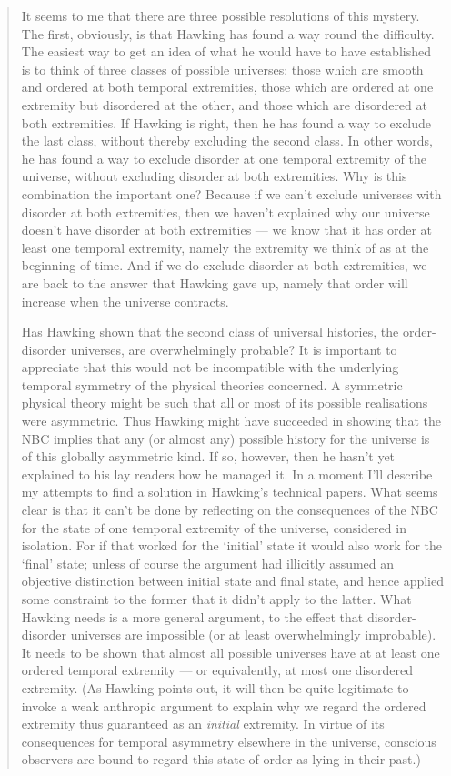 \documentclass{article}
\begin{document}
\begin{quote}
It seems to me that there are three possible resolutions of this
mystery. The first, obviously, is that Hawking has found a way round the
difficulty. The easiest way to get an idea of what he would have to have
established is to think of three classes of possible universes: those
which are smooth and ordered at both temporal extremities, those which
are ordered at one extremity but disordered at the other, and those
which are disordered at both extremities. If Hawking is right, then he
has found a way to exclude the last class, without thereby excluding the
second class. In other words, he has found a way to exclude disorder at
one temporal extremity of the universe, without excluding disorder at
both extremities. Why is this combination the important one? Because if
we can't exclude universes with disorder at both extremities, then we
haven't explained why our universe doesn't have disorder at both
extremities --- we know that it has order at least one temporal
extremity, namely the extremity we think of as at the beginning of time.
And if we do exclude disorder at both extremities, we are back to the
answer that Hawking gave up, namely that order will increase when the
universe contracts.

Has Hawking shown that the second class of universal histories, the
order-disorder universes, are overwhelmingly probable? It is important
to appreciate that this would not be incompatible with the underlying
temporal symmetry of the physical theories concerned. A symmetric
physical theory might be such that all or most of its possible
realisations were asymmetric. Thus Hawking might have succeeded in
showing that the NBC implies that any (or almost any) possible history
for the universe is of this globally asymmetric kind. If so, however,
then he hasn't yet explained to his lay readers how he managed it. In a
moment I'll describe my attempts to find a solution in Hawking's
technical papers. What seems clear is that it can't be done by
reflecting on the consequences of the NBC for the state of one temporal
extremity of the universe, considered in isolation. For if that worked
for the `initial' state it would also work for the `final' state; unless
of course the argument had illicitly assumed an objective distinction
between initial state and final state, and hence applied some constraint
to the former that it didn't apply to the latter. What Hawking needs is
a more general argument, to the effect that disorder-disorder universes
are impossible (or at least overwhelmingly improbable). It needs to be
shown that almost all possible universes have at at least one ordered
temporal extremity --- or equivalently, at most one disordered
extremity. (As Hawking points out, it will then be quite legitimate to
invoke a weak anthropic argument to explain why we regard the ordered
extremity thus guaranteed as an \emph{initial} extremity. In virtue of
its consequences for temporal asymmetry elsewhere in the universe,
conscious observers are bound to regard this state of order as lying in
their past.)


\end{quote}
\end{document}

